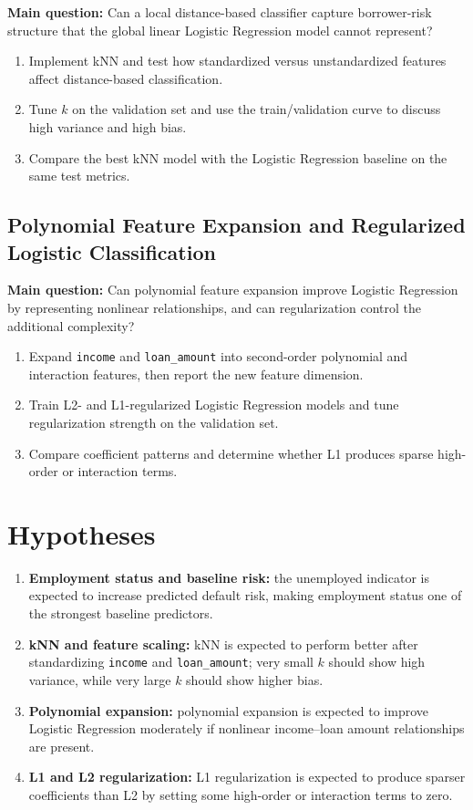\documentclass[12pt]{article}
\begin{document}
\textbf{Main question:} Can a local distance-based classifier capture borrower-risk structure that the global linear Logistic Regression model cannot represent?

\begin{enumerate}[label=\textbf{2(\alph*)}]
    \item Implement kNN and test how standardized versus unstandardized features affect distance-based classification.
    \item Tune $k$ on the validation set and use the train/validation curve to discuss high variance and high bias.
    \item Compare the best kNN model with the Logistic Regression baseline on the same test metrics.
\end{enumerate}

\subsection{Polynomial Feature Expansion and Regularized Logistic Classification}

\textbf{Main question:} Can polynomial feature expansion improve Logistic Regression by representing nonlinear relationships, and can regularization control the additional complexity?

\begin{enumerate}[label=\textbf{3(\alph*)}]
    \item Expand \texttt{income} and \texttt{loan\_amount} into second-order polynomial and interaction features, then report the new feature dimension.
    \item Train L2- and L1-regularized Logistic Regression models and tune regularization strength on the validation set.
    \item Compare coefficient patterns and determine whether L1 produces sparse high-order or interaction terms.
\end{enumerate}

\section{Hypotheses}

\begin{enumerate}[label=(\roman*)]
    \item \textbf{Employment status and baseline risk:} the unemployed indicator is expected to increase predicted default risk, making employment status one of the strongest baseline predictors.
    \item \textbf{kNN and feature scaling:} kNN is expected to perform better after standardizing \texttt{income} and \texttt{loan\_amount}; very small $k$ should show high variance, while very large $k$ should show higher bias.
    \item \textbf{Polynomial expansion:} polynomial expansion is expected to improve Logistic Regression moderately if nonlinear income--loan amount relationships are present.
    \item \textbf{L1 and L2 regularization:} L1 regularization is expected to produce sparser coefficients than L2 by setting some high-order or interaction terms to zero.
\end{enumerate}
\end{document}
